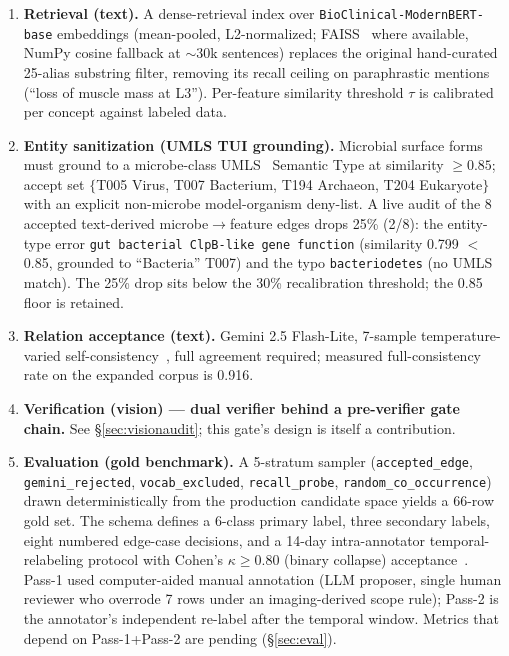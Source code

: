 \documentclass[10pt,twocolumn,letterpaper]{article}
\begin{document}
\begin{enumerate}
\item \textbf{Retrieval (text).} A dense-retrieval index over
\texttt{BioClinical-ModernBERT-base} embeddings (mean-pooled, L2-normalized;
FAISS~\cite{johnson2019faiss} where available, NumPy cosine fallback at
$\sim$30k sentences) replaces the original hand-curated 25-alias substring
filter, removing its recall ceiling on paraphrastic mentions (``loss of
muscle mass at L3''). Per-feature similarity threshold $\tau$ is calibrated
per concept against labeled data.

\item \textbf{Entity sanitization (UMLS TUI grounding).} Microbial surface
forms must ground to a microbe-class UMLS~\cite{bodenreider2004umls}
Semantic Type at similarity $\geq 0.85$; accept set $\{$T005 Virus, T007
Bacterium, T194 Archaeon, T204 Eukaryote$\}$ with an explicit non-microbe
model-organism deny-list. A live
audit of the 8 accepted text-derived microbe$\rightarrow$feature edges drops
25\% (2/8): the entity-type error \texttt{gut bacterial ClpB-like gene
function} (similarity 0.799 $<$ 0.85, grounded to ``Bacteria'' T007) and the
typo \texttt{bacteriodetes} (no UMLS match). The 25\% drop sits below the
30\% recalibration threshold; the 0.85 floor is retained.

\item \textbf{Relation acceptance (text).} Gemini 2.5 Flash-Lite,
7-sample temperature-varied self-consistency~\cite{wang2023selfconsistency},
full agreement required; measured full-consistency rate on the expanded
corpus is 0.916.

\item \textbf{Verification (vision) --- dual verifier behind a
pre-verifier gate chain.} See \S\ref{sec:visionaudit}; this gate's design is
itself a contribution.

\item \textbf{Evaluation (gold benchmark).} A 5-stratum sampler
(\texttt{accepted\_edge}, \texttt{gemini\_rejected}, \texttt{vocab\_excluded},
\texttt{recall\_probe}, \texttt{random\_co\_occurrence}) drawn deterministically
from the production candidate space yields a 66-row gold set. The schema
defines a 6-class primary label, three secondary labels, eight numbered
edge-case decisions, and a 14-day intra-annotator temporal-relabeling
protocol with Cohen's $\kappa \geq 0.80$ (binary collapse)
acceptance~\cite{landis1977kappa}.
Pass-1 used computer-aided manual annotation (LLM proposer, single human
reviewer who overrode 7 rows under an imaging-derived scope rule); Pass-2 is
the annotator's independent re-label after the temporal window. Metrics that
depend on Pass-1+Pass-2 are pending (\S\ref{sec:eval}).
\end{enumerate}
\end{document}
